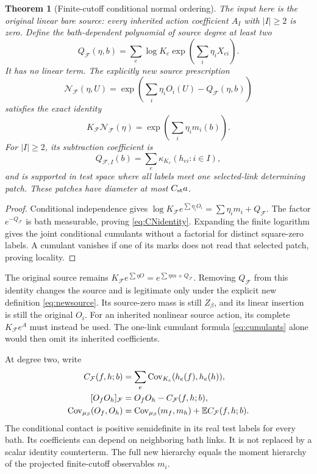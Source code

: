 \documentclass[11pt,letterpaper]{article}
\theoremstyle{plain}
\newtheorem{theorem}{Theorem}[section]
\theoremstyle{remark}\newtheorem{remark}[theorem]{Scope}
\newcommand{\E}{\mathbb E}\newcommand{\R}{\mathbb R}
\begin{document}
\begin{theorem}[Finite-cutoff conditional normal ordering]
\label{thm:normalorder}
The input here is the original linear bare source: every inherited action
coefficient $A_I$ with $|I|\ge2$ is zero.
Define the bath-dependent polynomial of source degree at least two
\begin{equation}
Q_{\mathcal F}(\eta,b)
=\sum_e\log K_e\exp\left(\sum_i\eta_iX_{ei}\right).
\label{eq:QF}
\end{equation}
It has no linear term. The explicitly \emph{new} source prescription
\begin{equation}
\mathcal N_{\mathcal F}(\eta,U)
=\exp\left(\sum_i\eta_iO_i(U)-Q_{\mathcal F}(\eta,b)\right)
\label{eq:newsource}
\end{equation}
satisfies the exact identity
\begin{equation}
K_{\mathcal F}\mathcal N_{\mathcal F}(\eta)
=\exp\left(\sum_i\eta_i m_i(b)\right).
\label{eq:CNidentity}
\end{equation}
For $|I|\ge2$, its subtraction coefficient is
\begin{equation}
Q_{\mathcal F,I}(b)=\sum_e\kappa_{K_e}(h_{ei}:i\in I),
\label{eq:cumulants}
\end{equation}
and is supported in test space where all labels meet one selected-link determining
patch. These patches have diameter at most $C_{\rm st}a$.
\end{theorem}
\begin{proof}
Conditional independence gives
$\log K_{\mathcal F}e^{\sum\eta_iO_i}=\sum\eta_i m_i+Q_{\mathcal F}$.
The factor $e^{-Q_{\mathcal F}}$ is bath measurable, proving
\eqref{eq:CNidentity}. Expanding the finite logarithm gives the joint conditional
cumulants without a factorial for distinct square-zero labels. A cumulant
vanishes if one of its marks does not read that selected patch, proving locality.
\end{proof}

The original source remains
$K_{\mathcal F}e^{\sum\eta O}=e^{\sum\eta m+Q_{\mathcal F}}$.
Removing $Q_{\mathcal F}$ from this identity changes the source and is legitimate
only under the explicit new definition \eqref{eq:newsource}. Its source-zero mass
is still $Z_\beta$, and its linear insertion is still the original $O_i$.
For an inherited nonlinear source action, its complete $K_{\mathcal F}e^A$ must
instead be used. The one-link cumulant formula \eqref{eq:cumulants} alone would
then omit its inherited coefficients.

At degree two, write
\begin{align}
C_{\mathcal F}(f,h;b)&=\sum_e\Cov_{K_e}(h_e(f),h_e(h)),\notag\\
[O_fO_h]_{\mathcal F}&=O_fO_h-C_{\mathcal F}(f,h;b),\notag\\
\Cov_{\mu_\beta}(O_f,O_h)
&=\Cov_{\mu_\beta}(m_f,m_h)+\E C_{\mathcal F}(f,h;b).
\label{eq:variance-decomp}
\end{align}
The conditional contact is positive semidefinite in its real test labels for every
bath. Its coefficients can depend on neighboring bath links. It is not replaced
by a scalar identity counterterm. The full new hierarchy equals the moment
hierarchy of the projected finite-cutoff observables $m_i$.
\end{document}
